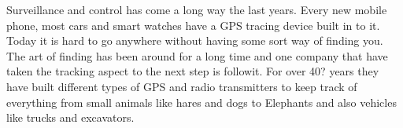 

Surveillance and control has come a long way the last years. Every new mobile phone, most cars and smart watches have a GPS tracing device built in to it. Today it is hard to go anywhere without having some sort way of finding you. The art of finding has been around for a long time and one company that have taken the tracking aspect to the next step is followit. For over 40? years they have built different types of GPS and radio transmitters to keep track of everything from small animals like hares and dogs to Elephants and also vehicles like trucks and excavators. 


\thispagestyle{empty}
